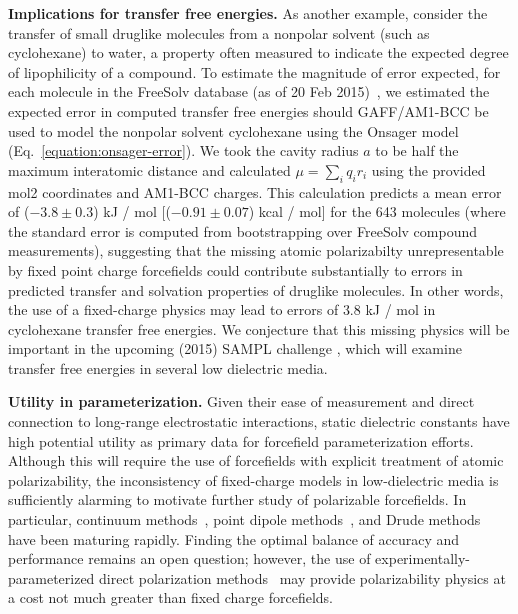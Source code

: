 \documentclass[journal=jacsat,manuscript=article]{achemso}
\begin{document}
{\bf Implications for transfer free energies.}
As another example, consider the transfer of small druglike molecules from a nonpolar solvent (such as cyclohexane) to water, a property often measured to indicate the expected degree of lipophilicity of a compound.
To estimate the magnitude of error expected, for each molecule in the FreeSolv database (as of 20 Feb 2015)~\cite{freesolv, freesolv_github}, we estimated the expected error in computed transfer free energies should GAFF/AM1-BCC be used to model the nonpolar solvent cyclohexane using the Onsager model (Eq.~\ref{equation:onsager-error}).
We took the cavity radius $a$ to be half the maximum interatomic distance and calculated $\mu = \sum_i q_i r_i$ using the provided mol2 coordinates and AM1-BCC charges.  
This calculation predicts a mean error of ($-3.8 \pm 0.3$) kJ / mol [($-0.91 \pm0.07$) kcal / mol] for the 643 molecules (where the standard error is computed from bootstrapping over FreeSolv compound measurements), 
suggesting that the missing atomic polarizabilty unrepresentable by fixed point charge forcefields could contribute substantially to errors in predicted transfer and solvation properties of druglike molecules.  
In other words, the use of a fixed-charge physics may lead to errors of $3.8$ kJ / mol in cyclohexane transfer free energies.  
We conjecture that this missing physics will be important in the upcoming (2015) SAMPL challenge \cite{newman2009practical}, which will examine transfer free energies in several low dielectric media. 

{\bf Utility in parameterization.}
Given their ease of measurement and direct connection to long-range electrostatic interactions, static dielectric constants have high potential utility as primary data for forcefield parameterization efforts.  
Although this will require the use of forcefields with explicit treatment of atomic polarizability, the inconsistency of fixed-charge models in low-dielectric media is sufficiently alarming to motivate further study of polarizable forcefields.  In particular, continuum methods~\cite{truchon2010using, truchon2009integrated, truchon2008accurate}, point dipole methods~\cite{Ponder2010, ren2004temperature}, and Drude methods~\cite{lamoureux2003modeling, anisimov2005determination} have been maturing rapidly.  Finding the optimal balance of accuracy and performance remains an open question; however, the use of experimentally-parameterized direct polarization methods~\cite{wang2013systematic} may provide polarizability physics at a cost not much greater than fixed charge forcefields.
\end{document}
